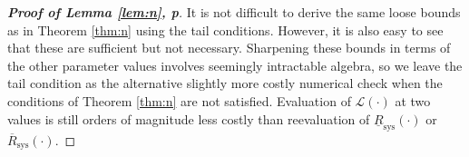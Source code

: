 \documentclass[12pt, a4paper]{elsarticle}
\newcommand{\ul}[1]{\underline{#1}}
\newcommand{\ol}[1]{\overline{#1}}
\newcommand{\lRsys}{\ul{R}_\text{sys}}
\newcommand{\uRsys}{\ol{R}_\text{sys}}
\begin{document}
\begin{proof}[\textbf{Proof of Lemma \ref{lem:n}, p\pageref{lem:n}}]
  \medskip
  
  It is not difficult to derive the same loose bounds as in Theorem \ref{thm:n}
  using the tail conditions.  However, it is also easy to see that 
  these are sufficient but not necessary.  Sharpening these bounds
  in terms of the other parameter values involves seemingly intractable
  algebra, so we leave the tail condition as the alternative slightly 
  more costly numerical check when the conditions of Theorem
  \ref{thm:n} are not satisfied.  Evaluation of $\mathcal{L}(\cdot)$ 
  at two values is still orders of magnitude less costly than 
  reevaluation of $\lRsys(\cdot)$ or $\uRsys(\cdot)$.
\end{proof}
%
%  
%  
\end{document}
